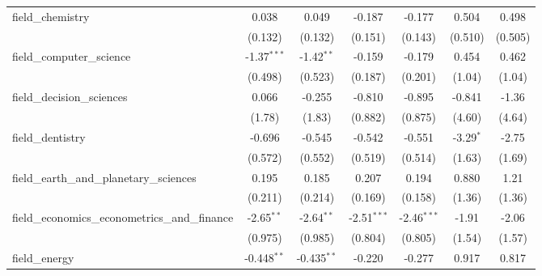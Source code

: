 \begin{tabular}{lcccccc}
   field\_chemistry                                            & 0.038          & 0.049          & -0.187         & -0.177          & 0.504        & 0.498\\   
                                                               & (0.132)        & (0.132)        & (0.151)        & (0.143)         & (0.510)      & (0.505)\\   
   field\_computer\_science                                    & -1.37$^{***}$  & -1.42$^{**}$   & -0.159         & -0.179          & 0.454        & 0.462\\   
                                                               & (0.498)        & (0.523)        & (0.187)        & (0.201)         & (1.04)       & (1.04)\\   
   field\_decision\_sciences                                   & 0.066          & -0.255         & -0.810         & -0.895          & -0.841       & -1.36\\   
                                                               & (1.78)         & (1.83)         & (0.882)        & (0.875)         & (4.60)       & (4.64)\\   
   field\_dentistry                                            & -0.696         & -0.545         & -0.542         & -0.551          & -3.29$^{*}$  & -2.75\\   
                                                               & (0.572)        & (0.552)        & (0.519)        & (0.514)         & (1.63)       & (1.69)\\   
   field\_earth\_and\_planetary\_sciences                      & 0.195          & 0.185          & 0.207          & 0.194           & 0.880        & 1.21\\   
                                                               & (0.211)        & (0.214)        & (0.169)        & (0.158)         & (1.36)       & (1.36)\\   
   field\_economics\_econometrics\_and\_finance                & -2.65$^{**}$   & -2.64$^{**}$   & -2.51$^{***}$  & -2.46$^{***}$   & -1.91        & -2.06\\   
                                                               & (0.975)        & (0.985)        & (0.804)        & (0.805)         & (1.54)       & (1.57)\\   
   field\_energy                                               & -0.448$^{**}$  & -0.435$^{**}$  & -0.220         & -0.277          & 0.917        & 0.817\\   

\end{tabular}

